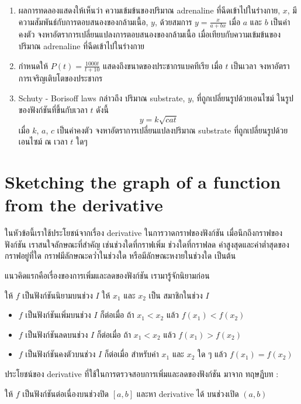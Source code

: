 \documentclass[
]{book}
\begin{document}
\begin{enumerate}
\def\labelenumi{\arabic{enumi}.}
\item
  ผลการทดลองแสดงให้เห็นว่า ความเข้มข้นของปริมาณ adrenaline ที่ฉีดเข้าไปในร่างกาย,
  \(x\), มีความสัมพันธ์กับการตอบสนองของกล้ามเนื้อ, \(y\), ด้วยสมการ
  \(y=\frac{x}{a+bx}\) เมื่อ \(a\) และ \(b\) เป็นค่าคงตัว
  จงหาอัตราการเปลี่ยนแปลงการตอบสนองของกล้ามเนื้อ เมื่อเทียบกับความเข้มข้นของปริมาณ
  adrenaline ที่ฉีดเข้าไปในร่างกาย
\item
  กำหนดให้ \(\displaystyle P(t)=\frac{1000t}{t+10}\)
  แสดงถึงขนาดของประชากรแบคทีเรีย เมื่อ \(t\) เป็นเวลา
  จงหาอัตราการเจริญเติบโตของประชากร
\item
  Schuty - Borisoff laws กล่าวถึง ปริมาณ substrate, \(y\),
  ที่ถูกเปลี่ยนรูปด้วยเอนไซม์ ในรูปของฟังก์ชันที่ขึ้นกับเวลา \(t\) ดังนี้ \[y=k\sqrt{cat}\]
  เมื่อ \(k\), \(a\), \(c\) เป็นค่าคงตัว จงหาอัตราการเปลี่ยนแปลงปริมาณ substrate
  ที่ถูกเปลี่ยนรูปด้วยเอนไซม์ ณ เวลา \(t\) ใดๆ
\end{enumerate}

\section{Sketching the graph of a function from the
derivative}\label{sec-sketch}

ในหัวข้อนี้เราใช้ประโยชน์จากเรื่อง derivative ในการวาดกราฟของฟังก์ชัน
เมื่อนึกถึงกราฟของฟังก์ชัน เราสนใจลักษณะที่สำคัญ เช่นช่วงใดที่กราฟเพิ่ม ช่วงใดที่กราฟลด
ค่าสูงสุดและค่าต่ำสุดของกราฟอยู่ที่ใด กราฟมีลักษณะคว่ำในช่วงใด หรือมีลักษณะหงายในช่วงใด
เป็นต้น

แนวคิดแรกคือเรื่องของการเพิ่มและลดของฟังก์ชัน เรามารู้จักนิยามก่อน

ให้ \(f\) เป็นฟังก์ชันนิยามบนช่วง \(I\) ให้ \(x_1\) และ \(x_2\) เป็น สมาชิกในช่วง
\(I\)

\begin{itemize}
\item
  \(f\) เป็นฟังก์ชันเพิ่มบนช่วง \(I\) ก็ต่อเมื่อ ถ้า \(x_1 < x_2\) แล้ว
  \(f(x_1) < f(x_2)\)
\item
  \(f\) เป็นฟังก์ชันลดบนช่วง \(I\) ก็ต่อเมื่อ ถ้า \(x_1 < x_2\) แล้ว
  \(f(x_1) > f(x_2)\)
\item
  \(f\) เป็นฟังก์ชันคงตัวบนช่วง \(I\) ก็ต่อเมื่อ สำหรับค่า \(x_1\) และ \(x_2\) ใด ๆ
  แล้ว \(f(x_1) = f(x_2)\)
\end{itemize}

ประโยชน์ของ derivative ที่ใช้ในการตรวจสอบการเพิ่มและลดของฟังก์ชัน มาจาก ทฤษฏีบท :

ให้ \(f\) เป็นฟังก์ชันต่อเนื่องบนช่วงปิด \([a,b]\) และหา derivative ได้ บนช่วงเปิด
\((a,b)\)
\end{document}
